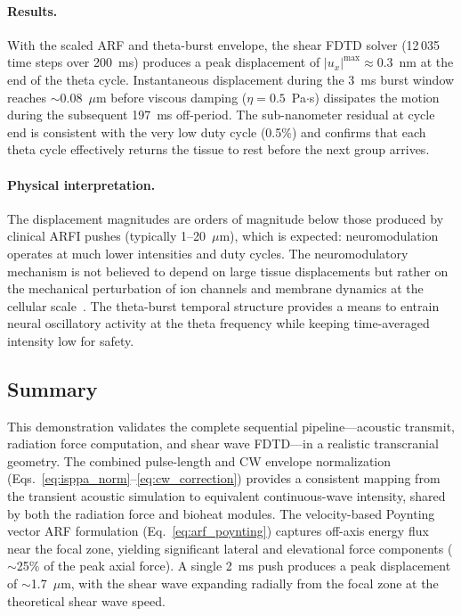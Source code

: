 \documentclass[11pt]{article}
\begin{document}
\paragraph{Results.}
With the scaled ARF and theta-burst envelope, the shear FDTD solver
(12\,035 time steps over 200~ms) produces a peak displacement of
$|u_x|^{\max} \approx 0.3$~nm at the end of the theta cycle.
Instantaneous displacement during the 3~ms burst window reaches
$\sim$0.08~$\mu$m before viscous damping ($\eta = 0.5$~Pa$\cdot$s)
dissipates the motion during the subsequent 197~ms off-period.  The
sub-nanometer residual at cycle end is consistent with the very low duty
cycle (0.5\%) and confirms that each theta cycle effectively returns the
tissue to rest before the next group arrives.

\paragraph{Physical interpretation.}
The displacement magnitudes are orders of magnitude below those produced by
clinical ARFI pushes (typically 1--20~$\mu$m), which is expected:
neuromodulation operates at much lower intensities and duty cycles.
The neuromodulatory mechanism is not believed to depend on large tissue
displacements but rather on the mechanical perturbation of ion channels
and membrane dynamics at the cellular
scale~\cite{blackmore2019ultrasound,jones2022neuromodulation}.  The
theta-burst temporal structure provides a means to entrain neural
oscillatory activity at the theta frequency while keeping time-averaged
intensity low for safety.

\subsection{Summary}

This demonstration validates the complete sequential pipeline---acoustic transmit,
radiation force computation, and shear wave FDTD---in a realistic transcranial
geometry.  The combined pulse-length and CW envelope normalization
(Eqs.~\ref{eq:isppa_norm}--\ref{eq:cw_correction}) provides a
consistent mapping from the transient acoustic simulation to equivalent
continuous-wave intensity, shared by both the radiation force and bioheat
modules.  The velocity-based Poynting vector ARF formulation
(Eq.~\ref{eq:arf_poynting}) captures off-axis energy flux near the focal zone,
yielding significant lateral and elevational force components ($\sim$25\% of the
peak axial force).  A single 2~ms push produces a peak displacement of
$\sim$1.7~$\mu$m, with the shear wave expanding radially from the focal zone
at the theoretical shear wave speed.
\end{document}
